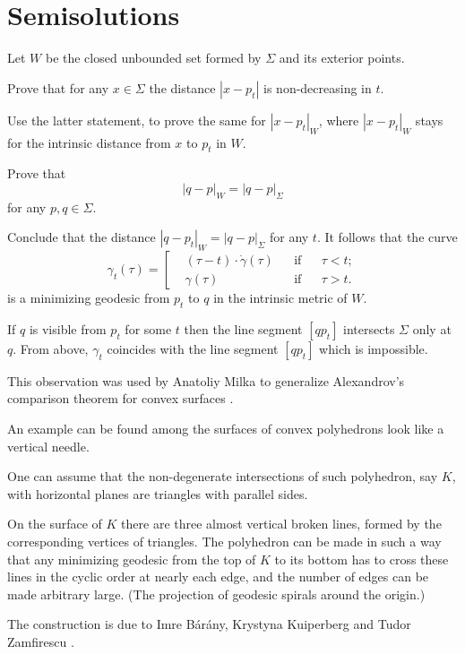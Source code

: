 \section*{Semisolutions}
Let $W$ be the closed unbounded set formed by $\Sigma$ and its exterior points.

Prove that for any $x\in\Sigma$ the distance $|x - p_t|$ is non-decreasing in $t$.

Use the latter statement, to prove the same for $|x - p_t|_W$,
where $|x - p_t|_W$ stays for the intrinsic distance from $x$ to $p_t$ in $W$.

Prove that 
\[|q - p|_W=|q - p|_\Sigma\] 
for any $p,q\in\Sigma$.


Conclude that the distance $|q - p_t|_W=|q - p|_\Sigma$
for any $t$.
It follows that the curve 
$$\gamma_t(\tau)=\left[
\begin{aligned}
&(\tau-t)\cdot\dot\gamma(\tau)&&\text{if}&&\tau< t;
\\
&\gamma(\tau)&&\text{if}&&\tau> t.
\end{aligned}
\right.$$
is a minimizing geodesic from $p_t$ to $q$ in the intrinsic metric of $W$. 

If $q$ is visible from $p_t$ for some $t$ then the line segment $[qp_t]$ intersects $\Sigma$ only at $q$.
From above, 
$\gamma_t$  coincides with the line segment $[qp_t]$ which is impossible.\qeds

This  observation was used by Anatoliy Milka
to generalize Alexandrov's comparison theorem for convex surfaces \cite[see][]{milka-geod}.

An example can be found among the surfaces of convex polyhedrons look like a vertical needle. 

One can assume that 
the non-degenerate intersections of such polyhedron, say $K$,
with horizontal planes are triangles with parallel sides.

On the surface of $K$ there are three almost vertical broken lines, 
formed by the corresponding vertices of triangles.
The polyhedron can be made in such a way that any minimizing geodesic from the top of $K$ to its bottom
has to cross these lines in the cyclic order at nearly each edge, and the number of edges can be made arbitrary large. 
(The projection of geodesic spirals around the origin.)\qeds

The construction is due to 
Imre B\'ar\'any, 
Krystyna Kuiperberg 
and Tudor Zamfirescu \cite[see][]{imre-kuiperberg-zamfirescu}.

